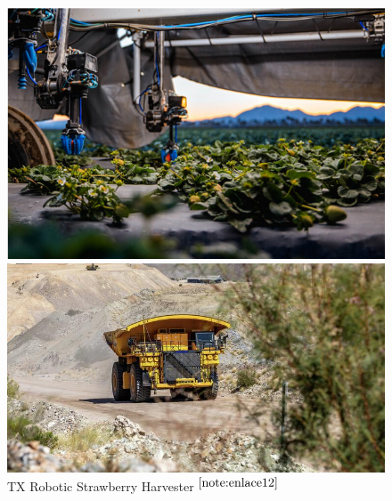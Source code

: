 


\begin{figure}[ht!]
	\centering
	\begin{minipage}{0.3\linewidth}
		\centering
		\includegraphics[width=\linewidth]{figs/strawberry.png}
		\caption*{\centering TX Robotic Strawberry Harvester $^{\ref{note:enlace12}}$ }
	\end{minipage}
	\hspace{3 cm}
	\begin{minipage}{0.3\linewidth}
		\centering
		\includegraphics[width=\linewidth]{figs/komatsu.jpeg}

\end{minipage}
\end{figure}
